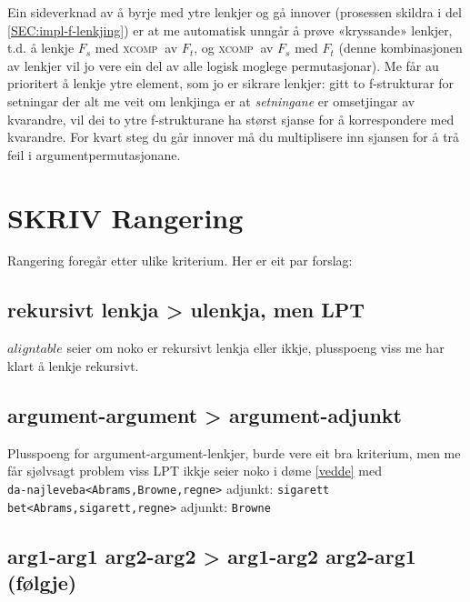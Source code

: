 \documentclass[11pt,a4paper,oneside,draft]{book}
\newcommand{\F}[2]{\textsc{#1}\ensuremath{_{#2}}}
\newcommand{\XCOMPs}{\F{xcomp~}{}}
\begin{document}
Ein sideverknad av å byrje med ytre lenkjer og gå innover (prosessen
skildra i del \ref{SEC:impl-f-lenkjing}) er at me automatisk unngår å
prøve «kryssande» lenkjer, t.d. å lenkje $F_s$ med \XCOMPs av $F_t$, og
\XCOMPs av $F_s$ med $F_t$ (denne kombinasjonen av lenkjer vil jo vere
ein del av alle logisk moglege permutasjonar). Me får au prioritert å
lenkje ytre element, som jo er sikrare lenkjer: gitt to f-strukturar
for setningar der alt me veit om lenkjinga er at \emph{setningane} er
omsetjingar av kvarandre, vil dei to ytre f-strukturane ha størst
sjanse for å korrespondere med kvarandre. For kvart steg du går
innover må du multiplisere inn sjansen for å trå feil i
argumentpermutasjonane.

\section{\textbf{SKRIV} Rangering}
\label{sec-4.2}

\label{SEC:impl-f-rangering}

Rangering foregår etter ulike kriterium. Her er eit par forslag:
\subsection{rekursivt lenkja > ulenkja, men LPT}
\label{sec-4.2.1}

    $aligntable$ seier om noko er rekursivt lenkja eller ikkje,
    plusspoeng viss me har klart å lenkje rekursivt.
\subsection{argument-argument > argument-adjunkt}
\label{sec-4.2.2}

    Plusspoeng for argument-argument-lenkjer, burde vere eit bra
    kriterium, men me får sjølvsagt problem viss LPT ikkje seier noko
    i døme \ref{vedde} med \\
    \texttt{da-najleveba<Abrams,Browne,regne>} adjunkt: \texttt{sigarett}\\
    \texttt{bet<Abrams,sigarett,regne>} adjunkt: \texttt{Browne}
    
\subsection{arg1-arg1 arg2-arg2 > arg1-arg2 arg2-arg1 (følgje)}
\label{sec-4.2.3}
\end{document}
